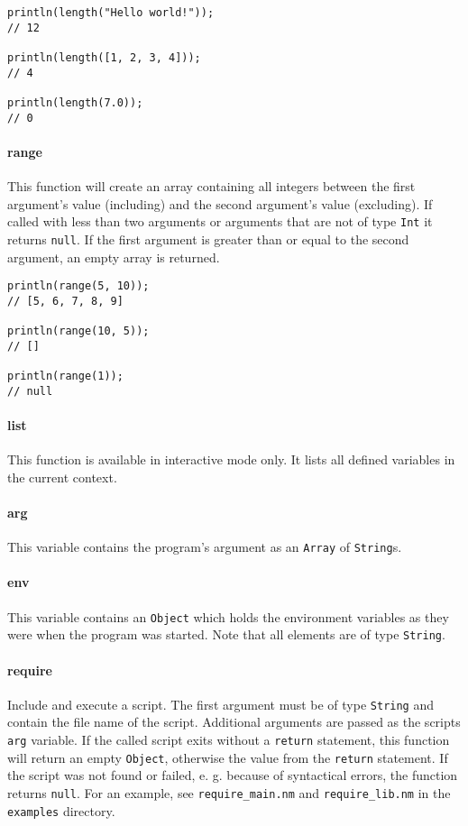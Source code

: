 \documentclass[a4paper, parskip, 10pt]{scrartcl}
\begin{document}
\begin{lstlisting}
println(length("Hello world!"));
// 12

println(length([1, 2, 3, 4]));
// 4

println(length(7.0));
// 0
\end{lstlisting}

\paragraph{range}
This function will create an array containing all integers between the first
argument's value (including) and the second argument's value (excluding). If
called with less than two arguments or arguments that are not of type
\texttt{Int} it returns \texttt{null}. If the first argument is greater than or
equal to the second argument, an empty array is returned.

\begin{lstlisting}
println(range(5, 10));
// [5, 6, 7, 8, 9]

println(range(10, 5));
// []

println(range(1));
// null
\end{lstlisting}

\paragraph{list}
This function is available in interactive mode only. It lists all defined
variables in the current context.

\paragraph{arg}
This variable contains the program's argument as an \texttt{Array} of
\texttt{String}s.

\paragraph{env}
This variable contains an \texttt{Object} which holds the environment variables
as they were when the program was started. Note that all elements are of type
\texttt{String}.

\paragraph{require}
Include and execute a script. The first argument must be of type
\texttt{String} and contain the file name of the script. Additional arguments
are passed as the scripts \texttt{arg} variable. If the called script exits
without a \texttt{return} statement, this function will return an empty
\texttt{Object}, otherwise the value from the \texttt{return} statement. If the
script was not found or failed, e. g. because of syntactical errors, the
function returns \texttt{null}. For an example, see \texttt{require\_main.nm}
and \texttt{require\_lib.nm} in the \texttt{examples} directory.
\end{document}
